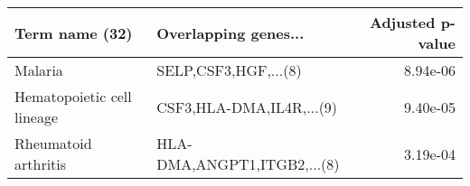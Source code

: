 \begin{tabular}{llr}
\toprule
            Term name (32) &        Overlapping genes... &  Adjusted p-value \\
\midrule
                   Malaria &        SELP,CSF3,HGF,...(8) &          8.94e-06 \\
Hematopoietic cell lineage &    CSF3,HLA-DMA,IL4R,...(9) &          9.40e-05 \\
      Rheumatoid arthritis & HLA-DMA,ANGPT1,ITGB2,...(8) &          3.19e-04 \\
\bottomrule
\end{tabular}
